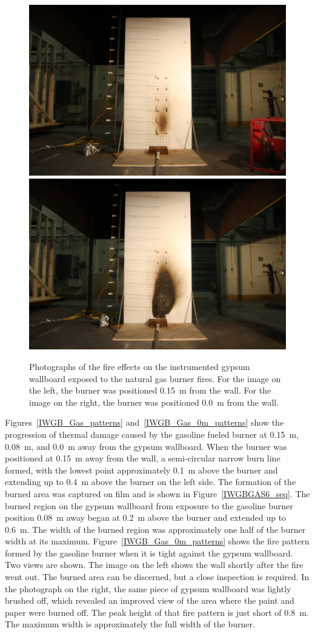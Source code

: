 \documentclass[twoside]{uocthesis}
\begin{document}
{\begin{figure}[p]
	\centering
	\includegraphics[trim=19.0in 5.0in 19.0in 15.0in, clip=true, width=0.4\columnwidth]{../Figures/IWGB_NG_0_15m}
	\includegraphics[trim=19.0in 5.0in 19.0in 15.0in, clip=true, width=0.4\columnwidth]{../Figures/IWGB_NG_0m} \\
	\caption[Photographs of the fire effects on the instrumented gypsum wallboard exposed to the natural gas burner fires]{Photographs of the fire effects on the instrumented gypsum wallboard exposed to the natural gas burner fires. For the image on the left, the burner was positioned 0.15~m from the wall.  For the image on the right, the burner was positioned 0.0~m from the wall.}
	\label{IWGB_NG_patterns}
\end{figure}

Figures~\ref{IWGB_Gas_patterns} and~\ref{IWGB_Gas_0m_patterns} show the progression of thermal damage caused by the gasoline fueled burner at 0.15~m, 0.08~m, and 0.0~m away from the gypsum wallboard.  When the burner was positioned at 0.15~m away from the wall, a semi-circular narrow burn line formed, with the lowest point approximately 0.1~m above the burner and extending up to 0.4~m above the burner on the left side.  The formation of the burned area was captured on film and is shown in Figure~\ref{IWGBGAS6_seq}.  The burned region on the gypsum wallboard from exposure to the gasoline burner position 0.08~m away began at 0.2~m above the burner and extended up to 0.6~m. The width of the burned region was approximately one half of the burner width at its maximum.  Figure~\ref{IWGB_Gas_0m_patterns} shows the fire pattern formed by the gasoline burner when it is tight against the gypsum wallboard.  Two views are shown.  The image on the left shows the wall shortly after the fire went out.  The burned area can be discerned, but a close inspection is required.  In the photograph on the right, the same piece of gypsum wallboard was lightly brushed off, which revealed an improved view of the area where the paint and paper were burned off.  The peak height of that fire pattern is just short of 0.8~m. The maximum width is approximately the full width of the burner.         

}
\end{document}
